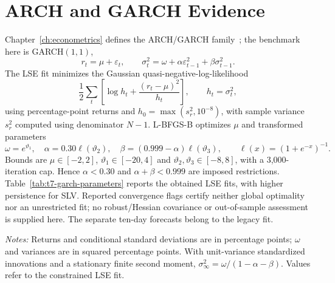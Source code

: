 \section{ARCH and GARCH Evidence}

Chapter~\ref{ch:econometrics} defines the ARCH/GARCH family~\cite{Engle1982,Bollerslev1986}; the benchmark here is GARCH$(1,1)$,
\[
 r_t=\mu+\varepsilon_t,\qquad
 \sigma_t^2=\omega+\alpha\varepsilon_{t-1}^2+\beta\sigma_{t-1}^2.
\]
The LSE fit minimizes the Gaussian quasi-negative-log-likelihood
\[
\frac12\sum_t\left[\log h_t+\frac{(r_t-\mu)^2}{h_t}\right],
\qquad h_t=\sigma_t^2,
\]
using percentage-point returns and $h_0=\max(s_r^2,10^{-8})$, with
sample variance $s_r^2$ computed using denominator $N-1$.
L-BFGS-B optimizes $\mu$ and transformed parameters
\[
\omega=e^{\vartheta_1},\quad
\alpha=0.30\ell(\vartheta_2),\quad
\beta=(0.999-\alpha)\ell(\vartheta_3),\qquad
\ell(x)=(1+e^{-x})^{-1}.
\]
Bounds are $\mu\in[-2,2]$, $\vartheta_1\in[-20,4]$ and
$\vartheta_2,\vartheta_3\in[-8,8]$, with a 3,000-iteration cap.
Hence $\alpha<0.30$ and $\alpha+\beta<0.999$ are imposed restrictions.
Table~\ref{tab:t7-garch-parameters} reports the obtained LSE fits, with higher persistence for
SLV. Reported convergence flags certify neither global optimality nor
an unrestricted fit; no robust/Hessian covariance or out-of-sample
assessment is supplied here. The separate ten-day forecasts belong
to the legacy fit.

\begin{table}[htbp]
\centering
\caption{GARCH(1,1) estimates for gold and silver daily returns}
\label{tab:t7-garch-parameters}
\small
{}
\begin{minipage}{0.94\textwidth}
\footnotesize\emph{Notes:} Returns and conditional standard deviations
are in percentage points; $\omega$ and variances are in squared
percentage points. With unit-variance standardized innovations and a
stationary finite second moment,
$\sigma_\infty^2=\omega/(1-\alpha-\beta)$.
Values refer to the constrained LSE fit.
\end{minipage}
\end{table}

